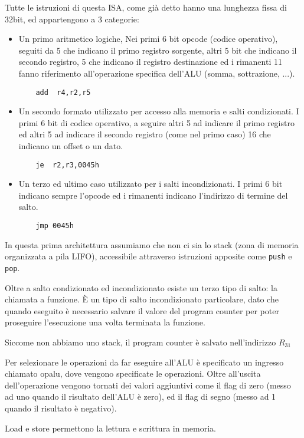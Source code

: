 \documentclass[../ace.tex]{subfiles}
\begin{document}
Tutte le istruzioni di questa ISA, come già detto hanno una lunghezza fissa di 32bit, ed appartengono a
3 categorie:
\begin{itemize}
    \item Un primo aritmetico logiche,
        Nei primi 6 bit opcode (codice operativo),
        seguiti da 5 che indicano il primo registro sorgente,
        altri 5 bit che indicano il secondo registro,
        5 che indicano il registro destinazione
        ed i rimanenti 11 fanno riferimento all'operazione specifica dell'ALU (somma, sottrazione, ...).
        \begin{lstlisting}
    add  r4,r2,r5
    \end{lstlisting}

    \item Un secondo formato utilizzato per accesso alla memoria e salti condizionati.
        I primi 6 bit di codice operativo,
        a seguire altri 5 ad indicare il primo registro
        ed altri 5 ad indicare il secondo registro (come nel primo caso)
        16 che indicano un offset o un dato.

        \begin{lstlisting}
    je  r2,r3,0045h
        \end{lstlisting}
    \item Un terzo ed ultimo caso utilizzato per i salti incondizionati.
        I primi 6 bit indicano sempre l'opcode ed i rimanenti indicano l'indirizzo di termine del
        salto.

        \begin{lstlisting}
    jmp 0045h
        \end{lstlisting}
\end{itemize}
In questa prima architettura assumiamo che non ci sia lo stack (zona di memoria organizzata a pila LIFO),
accessibile attraverso istruzioni apposite come \lstinline{push} e \lstinline{pop}.

Oltre a salto condizionato ed incondizionato esiste un terzo tipo di salto: la chiamata a funzione.
È un tipo di salto incondizionato particolare, dato che quando eseguito è necessario salvare il valore
del program counter per poter proseguire l'esecuzione una volta terminata la funzione.

Siccome non abbiamo uno stack, il program counter è salvato nell'indirizzo $R_{31}$

Per selezionare le operazioni da far eseguire all'ALU è specificato un ingresso chiamato opalu, dove vengono
specificate le operazioni. Oltre all'uscita dell'operazione vengono tornati dei valori aggiuntivi come
il flag di zero (messo ad uno quando il risultato dell'ALU è zero), ed il flag di segno (messo ad 1 quando il
risultato è negativo).

Load e store permettono la lettura e scrittura in memoria.
\end{document}
